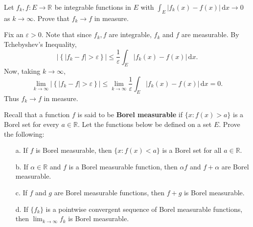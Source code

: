 
\begin{problem}{1}
  Let $f_{k},f : E \to \mathbb{R}^{}$ be integrable functions in $E$ with $ \int_{ E} \! |f_{k}(x) - f(x)| \, \mathrm{d}x \to 0$ as $k \to \infty$.
  Prove that $f_{k} \to f$ in measure.
\end{problem}

\begin{solution}
  Fix an $\varepsilon > 0$.
  Note that since $f_{k},f$ are integrable, $f_{k}$ and $f$ are measurable.
  By Tchebyshev's Inequality,
  \[
  \left| \left\{ \left| f_{k} - f \right| > \varepsilon \right\} \right| \leq \frac{1}{\varepsilon} \int_{ E} \! \left| f_{k}(x) - f(x) \right| \, \mathrm{d}x 
  .\] 
  Now, taking $k \to \infty$,
  \[
  \lim_{k \to \infty} \left| \left\{ \left| f_{k} - f \right| > \varepsilon \right\} \right| \leq \lim_{k \to \infty} \frac{1}{\varepsilon} \int_{ E} \! \left| f_{k}(x) - f(x) \right| \, \mathrm{d}x = 0
  .\] 
  Thus $f_{k} \to f$ in measure.
\end{solution}

\pagebreak

\begin{problem}{2}
  Recall that a function $f$ is said to be \textbf{Borel measurable} if $\{x : f(x) > a\}$ is a Borel set for every $a \in \mathbb{R}$. Let the functions below be defined on a set $E$. Prove the following:
  \begin{enumerate}
    \item[a.] If $f$ is Borel measurable, then $\{x : f(x) < a\}$ is a Borel set for all $a \in \mathbb{R}$.
    \item[b.] If $\alpha \in \mathbb{R}$ and $f$ is a Borel measurable function, then $\alpha f$ and $f + \alpha$ are Borel measurable.
    \item[c.] If $f$ and $g$ are Borel measurable functions, then $f + g$ is Borel measurable.
    \item[d.] If $\{f_k\}$ is a pointwise convergent sequence of Borel measurable functions, then $\lim_{k \to \infty} f_k$ is Borel measurable.
  \end{enumerate}
\end{problem}

